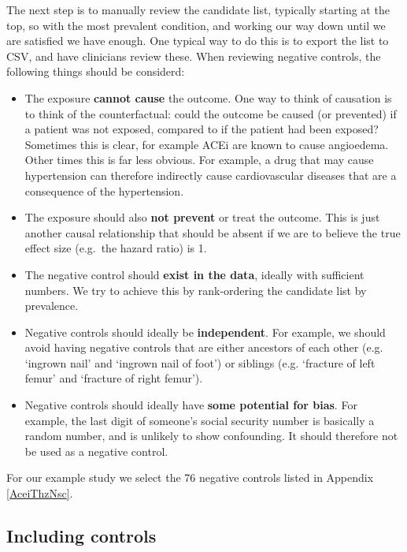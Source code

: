 \documentclass[11pt]{book}
\providecommand{\tightlist}{%
  \setlength{\itemsep}{0pt}\setlength{\parskip}{0pt}}
\begin{document}
The next step is to manually review the candidate list, typically
starting at the top, so with the most prevalent condition, and working
our way down until we are satisfied we have enough. One typical way to
do this is to export the list to CSV, and have clinicians review these.
When reviewing negative controls, the following things should be
considerd:

\begin{itemize}
\tightlist
\item
  The exposure \textbf{cannot cause} the outcome. One way to think of
  causation is to think of the counterfactual: could the outcome be
  caused (or prevented) if a patient was not exposed, compared to if the
  patient had been exposed? Sometimes this is clear, for example ACEi
  are known to cause angioedema. Other times this is far less obvious.
  For example, a drug that may cause hypertension can therefore
  indirectly cause cardiovascular diseases that are a consequence of the
  hypertension.
\item
  The exposure should also \textbf{not prevent} or treat the outcome.
  This is just another causal relationship that should be absent if we
  are to believe the true effect size (e.g.~the hazard ratio) is 1.
\item
  The negative control should \textbf{exist in the data}, ideally with
  sufficient numbers. We try to achieve this by rank-ordering the
  candidate list by prevalence.
\item
  Negative controls should ideally be \textbf{independent}. For example,
  we should avoid having negative controls that are either ancestors of
  each other (e.g. `ingrown nail' and `ingrown nail of foot') or
  siblings (e.g. `fracture of left femur' and `fracture of right
  femur').
\item
  Negative controls should ideally have \textbf{some potential for
  bias}. For example, the last digit of someone's social security number
  is basically a random number, and is unlikely to show confounding. It
  should therefore not be used as a negative control.
\end{itemize}

For our example study we select the 76 negative controls listed in
Appendix \ref{AceiThzNsc}.

\subsection{Including controls}\label{including-controls}
\end{document}
